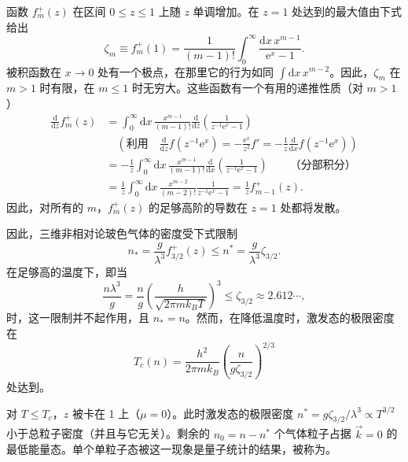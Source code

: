 函数 $f_m^+(z)$ 在区间 $0\le z\le1$ 上随 $z$ 单调增加。在 $z=1$ 处达到的最大值由下式给出
\begin{equation}\label{eq:7.50}
\zeta_m\equiv f_m^+(1)=\frac1{(m-1)!}\int_0^\infty\frac{\mathrm dx\,x^{m-1}}{\mathrm e^x-1}.
\end{equation}
被积函数在 $x\to0$ 处有一个极点，在那里它的行为如同 $\int\mathrm dx\,x^{m-2}$。因此，$\zeta_m$ 在 $m>1$ 时有限，在 $m\le1$ 时无穷大。这些函数有一个有用的递推性质（对 $m>1$）
\begin{equation}\label{eq:7.51}
\begin{aligned}
\frac{\mathrm d}{\mathrm dz}f_m^+(z)&=\int_0^\infty\mathrm dx\,\frac{x^{m-1}}{(m-1)!}\frac{\mathrm d}{\mathrm dz}\left(\frac1{z^{-1}\mathrm e^x-1}\right)\\
&\quad\left(\text{利用}\quad\frac{\mathrm d}{\mathrm dz}f(z^{-1}\mathrm e^x)=-\frac{\mathrm e^x}{z^2}f'=-\frac1z\frac{\mathrm d}{\mathrm dx}f(z^{-1}\mathrm e^x)\right)\\
&=-\frac1z\int_0^\infty\mathrm dx\,\frac{x^{m-1}}{(m-1)!}\frac{\mathrm d}{\mathrm dx}\left(\frac1{z^{-1}\mathrm e^x-1}\right)\qquad\text{（分部积分）}\\
&=\frac1z\int_0^\infty\mathrm dx\,\frac{x^{m-2}}{(m-2)!}\frac1{z^{-1}\mathrm e^x-1}=\frac1zf_{m-1}^+(z).
\end{aligned}
\end{equation}
因此，对所有的 $m$，$f_m^+(z)$ 的足够高阶的导数在 $z=1$ 处都将发散。



因此，三维非相对论玻色气体的密度受下式限制
\begin{equation}\label{eq:7.52}
n_\ast=\frac g{\lambda^3}f_{3/2}^+(z)\le n^*=\frac g{\lambda^3}\zeta_{3/2}.
\end{equation}
在足够高的温度下，即当
\begin{equation}\label{eq:7.53}
\frac{n\lambda^3}g=\frac ng\left(\frac h{\sqrt{2\pi mk_BT}}\right)^3\le\zeta_{3/2}\approx2.612\cdots,
\end{equation}
时，这一限制并不起作用，且 $n_\ast=n$。然而，在降低温度时，激发态的极限密度在
\begin{equation}\label{eq:7.54}
T_c(n)=\frac{h^2}{2\pi mk_B}\left(\frac n{g\zeta_{3/2}}\right)^{2/3}
\end{equation}
处达到。

对 $T\le T_c$，$z$ 被卡在 1 上（$\mu=0$）。此时激发态的极限密度 $n^*=g\zeta_{3/2}/\lambda^3\propto T^{3/2}$ 小于总粒子密度（并且与它无关）。剩余的 $n_0=n-n^*$ 个气体粒子占据 $\vec k=0$ 的最低能量态。单个单粒子态被这一现象是量子统计的结果，被称为。

